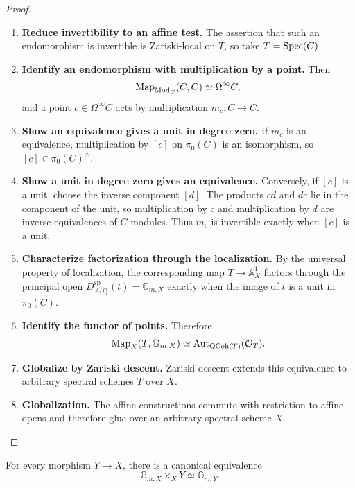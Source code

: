 \begin{proof}
\begin{enumerate}[label=\textup{(\arabic*)}]
    \item \textbf{Reduce invertibility to an affine test.}
    The assertion
    that such an endomorphism is invertible is Zariski-local on \(T\), so
    take \(T=\operatorname{Spec}(C)\).

    \item \textbf{Identify an endomorphism with multiplication by a point.}
    Then
    \[
        \operatorname{Map}_{\operatorname{Mod}_C}(C,C)
        \simeq
        \Omega^\infty C,
    \]
    and a point \(c\in\Omega^\infty C\) acts by multiplication
    \(m_c:C\to C\).

    \item \textbf{Show an equivalence gives a unit in degree zero.}
    If \(m_c\) is an equivalence, multiplication by \([c]\) on
    \(\pi_0(C)\) is an isomorphism, so \([c]\in\pi_0(C)^\times\).

    \item \textbf{Show a unit in degree zero gives an equivalence.}
    Conversely, if \([c]\) is a unit, choose the inverse component
    \([d]\). The products \(cd\) and \(dc\) lie in the component of the
    unit, so multiplication by \(c\) and multiplication by \(d\) are inverse
    equivalences of \(C\)-modules. Thus \(m_c\) is invertible exactly when
    \([c]\) is a unit.

    \item \textbf{Characterize factorization through the localization.}
    By the universal property of localization, the corresponding map
    \(T\to\mathbb A_X^1\) factors through the principal open
    \(D_{A\{t\}}^{\mathrm{sp}}(t)=\mathbb G_{m,X}\) exactly when the image of \(t\) is a unit in
    \(\pi_0(C)\).

    \item \textbf{Identify the functor of points.}
    Therefore
    \[
        \operatorname{Map}_X(T,\mathbb G_{m,X})
        \simeq
        \operatorname{Aut}_{\operatorname{QCoh}(T)}(\mathcal O_T).
    \]

    \item \textbf{Globalize by Zariski descent.}
    Zariski descent extends this equivalence to arbitrary spectral schemes
    \(T\) over \(X\).

    \item \textbf{Globalization.}
    The affine constructions commute with restriction to affine opens and
    therefore glue over an arbitrary spectral scheme \(X\).
\end{enumerate}
\end{proof}

\begin{proposition}
\label{prop:multiplicative-group-base-change}
For every morphism $Y\to X$, there is a canonical equivalence
\[
    \mathbb G_{m,X}
    \times_X
    Y
    \simeq
    \mathbb G_{m,Y}.
\]
\end{proposition}

